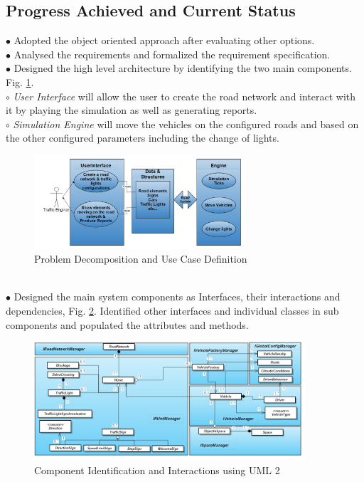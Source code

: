\documentclass[11pt]{article}
\begin{document}
	\subsection{Progress Achieved and Current Status}\label{PACS}
		 $\bullet$ Adopted the object oriented approach after evaluating other options.\\
		 $\bullet$ Analysed the requirements and formalized the requirement specification.\\
		 $\bullet$ Designed the high level architecture by identifying the two main components. Fig. \ref{fig:HLD}.\\
		\hspace*{1.5ex} $\circ$ \textit{User Interface} will allow the user to create the road network and interact with it by playing the simulation as well as generating reports.\\
		\hspace*{1.5ex} $\circ$ \textit{Simulation Engine} will move the vehicles on the configured roads and based on the other configured parameters including the change of lights.
			\begin{figure}[h]
		     		\centering
    				\includegraphics[width=0.7\textwidth]{highlevel}
    				\caption{Problem Decomposition and Use Case Definition}
    				\label{fig:HLD}
			\end{figure}
		\\
		 $\bullet$ Designed the main system components as Interfaces, their interactions and dependencies, Fig. \ref{fig:FCD}. Identified other interfaces and individual classes in sub components and populated the attributes and methods. 
			\begin{figure}[h]
			     \centering
    				\includegraphics[width=0.9\textwidth]{fullclassdiagram}
    				\caption{Component Identification and Interactions using UML 2}
    				\label{fig:FCD}
			\end{figure}	
\end{document}
